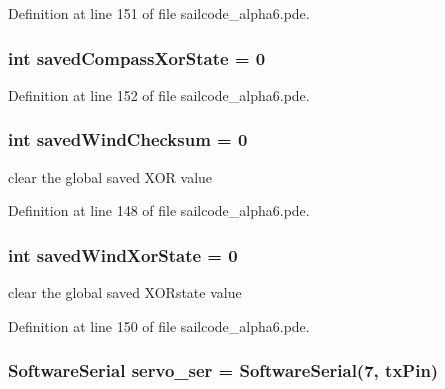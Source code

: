 \-Definition at line 151 of file sailcode\-\_\-alpha6.\-pde.

\hypertarget{group__group1_ga766482b676879097212dc7aba1450aa0}{
\subsubsection[{saved\-Compass\-Xor\-State}]{\setlength{\rightskip}{0pt plus 5cm}int {\bf saved\-Compass\-Xor\-State} = 0}}
\label{group__group1_ga766482b676879097212dc7aba1450aa0}


\-Definition at line 152 of file sailcode\-\_\-alpha6.\-pde.

\hypertarget{group__group1_gaf7ce3159cdebccf941f8db4e70f5764e}{
\subsubsection[{saved\-Wind\-Checksum}]{\setlength{\rightskip}{0pt plus 5cm}int {\bf saved\-Wind\-Checksum} = 0}}
\label{group__group1_gaf7ce3159cdebccf941f8db4e70f5764e}


clear the global saved \-X\-O\-R value 



\-Definition at line 148 of file sailcode\-\_\-alpha6.\-pde.

\hypertarget{group__group1_gabc070e9e6f6449471852bd233593d1d2}{
\subsubsection[{saved\-Wind\-Xor\-State}]{\setlength{\rightskip}{0pt plus 5cm}int {\bf saved\-Wind\-Xor\-State} = 0}}
\label{group__group1_gabc070e9e6f6449471852bd233593d1d2}


clear the global saved \-X\-O\-Rstate value 



\-Definition at line 150 of file sailcode\-\_\-alpha6.\-pde.

\hypertarget{group__group1_gad08dcd7d87414b8d7f7e9cf2689ea5d8}{
\subsubsection[{servo\-\_\-ser}]{\setlength{\rightskip}{0pt plus 5cm}\-Software\-Serial {\bf servo\-\_\-ser} = \-Software\-Serial(7, tx\-Pin)}}
\label{group__group1_gad08dcd7d87414b8d7f7e9cf2689ea5d8}


